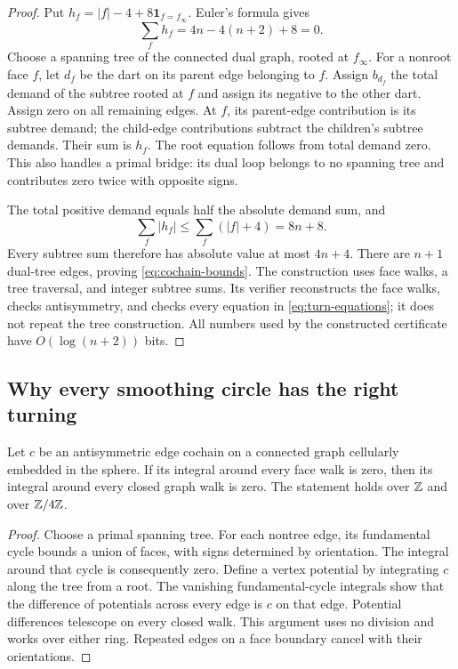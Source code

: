 \begin{proof}
Put $h_f=|f|-4+8\mathbf1_{f=f_\infty}$. Euler's formula gives
\[
 \sum_f h_f=4n-4(n+2)+8=0.
\]
Choose a spanning tree of the connected dual graph, rooted at $f_\infty$.
For a nonroot face $f$, let $d_f$ be the dart on its parent edge belonging
to $f$. Assign $b_{d_f}$ the total demand of the subtree rooted at $f$ and
assign its negative to the other dart. Assign zero on all remaining edges.
At $f$, its parent-edge contribution is its subtree demand; the
child-edge contributions subtract the children's subtree demands.
Their sum is $h_f$. The root equation follows from total demand zero.
This also handles a primal bridge: its dual loop belongs to no spanning
tree and contributes zero twice with opposite signs.

The total positive demand equals half the absolute demand sum, and
\[
 \sum_f |h_f|\le\sum_f(|f|+4)=8n+8.
\]
Every subtree sum therefore has absolute value at most $4n+4$.
There are $n+1$ dual-tree edges, proving \eqref{eq:cochain-bounds}.
The construction uses face walks, a tree traversal, and integer subtree
sums. Its verifier reconstructs the face walks, checks antisymmetry, and
checks every equation in \eqref{eq:turn-equations}; it does not repeat the
tree construction. All numbers used by the constructed certificate have
$O(\log(n+2))$ bits.
\end{proof}

\subsection{Why every smoothing circle has the right turning}

\begin{lemma}
\label{lem:closed-cochain}
Let $c$ be an antisymmetric edge cochain on a connected graph cellularly
embedded in the sphere. If its integral around every face walk is zero,
then its integral around every closed graph walk is zero. The statement
holds over $\mathbb Z$ and over $\mathbb Z/4\mathbb Z$.
\end{lemma}

\begin{proof}
Choose a primal spanning tree. For each nontree edge, its fundamental
cycle bounds a union of faces, with signs determined by orientation.
The integral around that cycle is consequently zero. Define a vertex
potential by integrating $c$ along the tree from a root. The vanishing
fundamental-cycle integrals show that the difference of potentials across
every edge is $c$ on that edge. Potential differences telescope on every
closed walk. This argument uses no division and works over either ring.
Repeated edges on a face boundary cancel with their orientations.
\end{proof}

